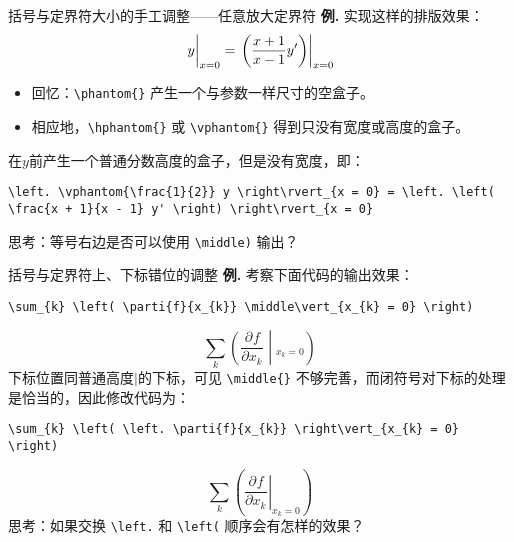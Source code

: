 \documentclass[mathserif]{beamer}
\newcommand{\codegreen}[1]{\textcolor{codegreen}{#1}}
\newcommand{\parti}[3][]{\frac{\partial^{#1} #2}{\partial {#3}^{#1}}}
\newenvironment{instance}{\zihao{-5}\textbf{\songti \codegreen{例.}}}{\hfill\par}
\begin{document}
\begin{frame}[fragile]{括号与定界符}{大小的手工调整——任意放大定界符}
\begin{instance}
	实现这样的排版效果：
\begin{equation*}
	\left. \vphantom{\frac{1}{2}} y \right\rvert_{x = 0} = \left. \left( \frac{x + 1}{x - 1} y' \right) \right\rvert_{x = 0}
\end{equation*}
\begin{itemize}

\item 回忆：\lstinline'\phantom{}' 产生一个与参数一样尺寸的空盒子。

\item 相应地，\lstinline'\hphantom{}' 或 \lstinline'\vphantom{}' 得到只没有宽度或高度的盒子。

\end{itemize}
在$y$前产生一个普通分数高度的盒子，但是没有宽度，即：
\begin{lstlisting}[numbers=none]
	\left. \vphantom{\frac{1}{2}} y \right\rvert_{x = 0} = \left. \left( \frac{x + 1}{x - 1} y' \right) \right\rvert_{x = 0}
\end{lstlisting}
思考：等号右边是否可以使用 \lstinline'\middle)' 输出？
\end{instance}
\end{frame}

\begin{frame}[fragile]{括号与定界符}{上、下标错位的调整}
\begin{instance}
	考察下面代码的输出效果：
\begin{lstlisting}[numbers=none]
	\sum_{k} \left( \parti{f}{x_{k}} \middle\vert_{x_{k} = 0} \right)
\end{lstlisting}
\begin{equation*}
	\sum_{k} \left( \parti{f}{x_{k}} \middle\vert_{x_{k} = 0} \right)
\end{equation*}
下标位置同普通高度$\vert$的下标，可见 \lstinline'\middle{}' 不够完善，而闭符号对下标的处理是恰当的，因此修改代码为：
\begin{lstlisting}[numbers=none]
	\sum_{k} \left( \left. \parti{f}{x_{k}} \right\vert_{x_{k} = 0} \right)
\end{lstlisting}
\begin{equation*}
	\sum_{k} \left( \left. \parti{f}{x_{k}} \right\vert_{x_{k} = 0} \right)
\end{equation*}
思考：如果交换 \lstinline'\left.' 和 \lstinline'\left(' 顺序会有怎样的效果？
\end{instance}
\end{frame}
\end{document}

